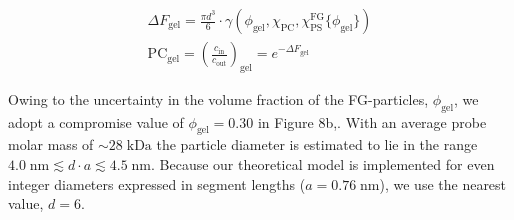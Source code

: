 \documentclass[10pt, a4paper]{article}
\begin{document}
\begin{multicols}{2}
\begin{eqnarray}
    \Delta F_{\text{gel}} =
    \frac{\pi d^3}{6} \cdot \gamma\left(
    \phi_{\text{gel}}, \chi_{\text{PC}},
    \chi_{\text{PS}}^{\text{FG}}\{ \phi_{\text{gel}} \}
    \right) \\
    \text{PC}_{\text{gel}} = \left(\frac{c_{\text{in}}}{c_{\text{out}}}\right)_{\text{gel}} = e^{-\Delta F_{\text{gel}}}
\end{eqnarray}

Owing to the uncertainty in the volume fraction of the FG-particles, $\phi_{\text{gel}}$, we adopt a compromise value of $\phi_{\text{gel}} = 0.30$ in Figure 8b,.  
With an average probe molar mass of \(\sim\!28\;\text{kDa}\) the particle diameter is estimated to lie in the range  $4.0\;\text{nm} \lesssim d\cdot a \lesssim 4.5\;\text{nm}$.
Because our theoretical model is implemented for even integer diameters expressed in segment lengths ($a = 0.76\;\text{nm}$), we use the
nearest value, $d = 6$.


\end{multicols}
\pagebreak

\begin{table}[htp]
    \centering
        \caption{Transport-related quantities extracted from the experimental studies.}
        \label{tbl:experimental}
\end{table}
\end{document}
